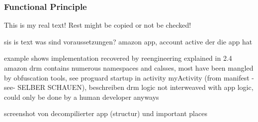 \subsubsection{Functional Principle}\label{subsection:license-amazon-functional}
This is my real text! Rest might be copied or not be checked!

sis is text
was sind voraussetzungen? amazon app, account active der die app hat\newline

%
example shows implementation recovered by reengineering explained in 2.4
amazon drm contains numerous namespaces and calsses, most have been mangled by obfuscation tools, see proguard
startup in activity myActivity (from manifest -see- SELBER SCHAUEN), beschreiben
drm logic not interweaved with app logic, could only be done by a human developer anyways

\cite{munteanLicense}
%

screenshot von decompilierter app (structur) und important places
